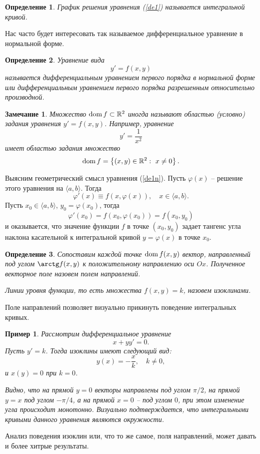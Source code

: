 \documentclass[a4paper,14pt]{extarticle}
\def\dom{{\rm dom\,}}
\newtheorem{definition}{Определение}[subsection]
\newtheorem{example}{Пример}[subsection]
\newtheorem{remark}{Замечание}[subsection]
\newcommand{\be}{\begin{equation}}
\newcommand{\ee}{\end{equation}}
\newcommand{\la}{\label}
\begin{document}
\begin{definition}
График решения уравнения (\ref{de1}) называется интегральной кривой.	
\end{definition}
Нас часто будет интересовать так называемое дифференциальное уравнение в нормальной форме.
\begin{definition}
Уравнение вида
\be\la{de1n}
y' = f(x, y)
\ee
называется дифференциальным уравнением первого порядка в нормальной форме или дифференциальным уравнением первого порядка разрешенным относительно производной.
\end{definition}
\begin{remark}
Множество $\dom f \subset \mathbb R^2$ иногда называют областью (условно) задания уравнения $y' = f(x, y)$. Например, уравнение
$$
y' = \frac{1}{x^2}
$$	
имеет областью задания множество 
$$
\dom f = \left\{(x, y) \in \mathbb R^2: \ x \neq 0\right\}.
$$
\end{remark}
Выясним геометрический смысл уравнения (\ref{de1n}). Пусть $\varphi(x)$ -- решение этого уравнения на $\langle a,  b \rangle$. Тогда
$$
\varphi'(x) \equiv f(x, \varphi(x)), \quad x \in \langle a,  b \rangle.
$$
Пусть $x_0 \in \langle a,  b \rangle$, $y_0 = \varphi(x_0)$, тогда
$$
\varphi'(x_0) = f(x_0, \varphi(x_0)) = f(x_0, y_0)
$$
и оказывается, что значение функции $f$ в точке $(x_0, y_0)$ задает тангенс угла наклона касательной к интегральной кривой $y = \varphi(x)$ в точке $x_0$.
\begin{definition}
Сопоставим каждой точке $\dom f(x, y)$ вектор, направленный под углом $\arctg f(x, y)$ к положительному направлению оси $Ox$. Полученное векторное поле назовем полем направлений. 

Линии уровня функции, то есть множества $f(x, y) = k$, назовем изоклинами.
\end{definition}
Поле направлений позволяет визуально прикинуть поведение интегральных кривых. 
\begin{example}
Рассмотрим дифференциальное уравнение 
$$
x + yy' = 0.
$$	
Пусть $y' = k$. Тогда изоклины имеют следующий вид:
$$
y(x) = -\frac{x}{k}, \quad k \neq 0,
$$
и $x(y) = 0$ при $k = 0$. 

Видно, что на прямой $y = 0$ векторы направлены под углом $\pi/2$, на прямой $y = x$ под углом $-\pi/4$, а на прямой $x = 0$ -- под углом $0$, при этом изменение угла происходит монотонно. Визуально подтверждается, что интегральными кривыми данного уравнения являются окружности.
\end{example}
Анализ поведения изоклин или, что то же самое, поля направлений, может давать и более хитрые результаты.
\end{document}
